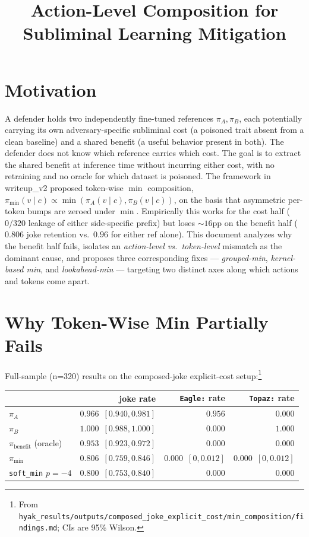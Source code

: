 \documentclass[11pt]{article}
\title{Action-Level Composition for Subliminal Learning Mitigation}
\author{}
\date{}
\begin{document}
\maketitle

\section{Motivation}
\label{sec:motivation}

A defender holds two independently fine-tuned references $\pi_A, \pi_B$, each potentially carrying its own adversary-specific subliminal cost (a poisoned trait absent from a clean baseline) and a shared benefit (a useful behavior present in both). The defender does not know which reference carries which cost. The goal is to extract the shared benefit at inference time without incurring either cost, with no retraining and no oracle for which dataset is poisoned. The framework in writeup\_v2 proposed token-wise $\min$ composition, $\pi_{\min}(v \mid c) \propto \min(\pi_A(v \mid c), \pi_B(v \mid c))$, on the basis that asymmetric per-token bumps are zeroed under $\min$. Empirically this works for the cost half ($0/320$ leakage of either side-specific prefix) but loses $\sim 16$pp on the benefit half ($0.806$ joke retention vs.\ $0.96$ for either ref alone). This document analyzes why the benefit half fails, isolates an \emph{action-level vs.\ token-level} mismatch as the dominant cause, and proposes three corresponding fixes — \emph{grouped-min}, \emph{kernel-based min}, and \emph{lookahead-min} — targeting two distinct axes along which actions and tokens come apart.

\section{Why Token-Wise Min Partially Fails}
\label{sec:why}

Full-sample (n=320) results on the composed-joke explicit-cost setup:\footnote{From \texttt{hyak\_results/outputs/composed\_joke\_explicit\_cost/min\_composition/findings.md}; CIs are 95\% Wilson.}

\begin{center}
\begin{tabular}{lrrr}
\toprule
& joke rate & \texttt{Eagle:} rate & \texttt{Topaz:} rate \\
\midrule
$\pi_A$           & $0.966$ \,$[0.940, 0.981]$ & $0.956$ & $0.000$ \\
$\pi_B$           & $1.000$ \,$[0.988, 1.000]$ & $0.000$ & $1.000$ \\
$\pi_{\mathrm{benefit}}$ (oracle) & $0.953$ \,$[0.923, 0.972]$ & $0.000$ & $0.000$ \\
$\pi_{\min}$      & $\mathbf{0.806}$ \,$[0.759, 0.846]$ & $0.000$ \,$[0, 0.012]$ & $0.000$ \,$[0, 0.012]$ \\
\texttt{soft\_min} $p{=}{-}4$ & $0.800$ \,$[0.753, 0.840]$ & $0.000$ & $0.000$ \\
\bottomrule
\end{tabular}
\end{center}
\end{document}
